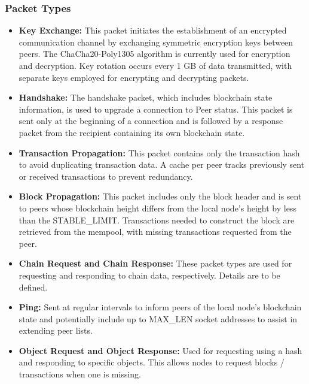 \documentclass[12pt,a4paper,twocolumn]{article}
\begin{document}
\subsubsection{Packet Types}
\begin{itemize}
\item \textbf{Key Exchange:} This packet initiates the establishment of an encrypted communication channel by exchanging symmetric encryption keys between peers. The ChaCha20-Poly1305 algorithm is currently used for encryption and decryption. Key rotation occurs every 1 GB of data transmitted, with separate keys employed for encrypting and decrypting packets.

\item \textbf{Handshake:} The handshake packet, which includes blockchain state information, is used to upgrade a connection to Peer status. This packet is sent only at the beginning of a connection and is followed by a response packet from the recipient containing its own blockchain state.\\

\item \textbf{Transaction Propagation:} This packet contains only the transaction hash to avoid duplicating transaction data. A cache per peer tracks previously sent or received transactions to prevent redundancy.\\

\item \textbf{Block Propagation:} This packet includes only the block header and is sent to peers whose blockchain height differs from the local node’s height by less than the STABLE\_LIMIT. Transactions needed to construct the block are retrieved from the mempool, with missing transactions requested from the peer.\\

\item \textbf{Chain Request and Chain Response:} These packet types are used for requesting and responding to chain data, respectively. Details are to be defined.\\

\item \textbf{Ping:} Sent at regular intervals to inform peers of the local node’s blockchain state and potentially include up to MAX\_LEN socket addresses to assist in extending peer lists.\\

\item \textbf{Object Request and Object Response:} Used for requesting using a hash and responding to specific objects. This allows nodes to request blocks / transactions when one is missing.\\


\end{itemize}
\end{document}
